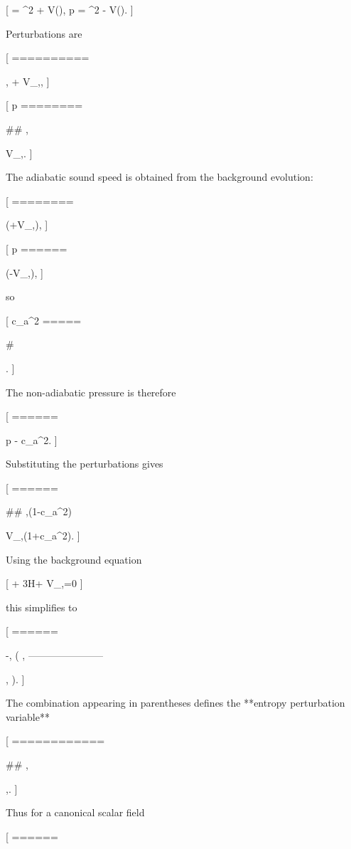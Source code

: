 [
\rho = \dot\phi^2 + V(\phi),
\qquad
p = \dot\phi^2 - V(\phi).
]

Perturbations are

[
\delta\rho
==========

\dot\phi,\delta\dot\phi
+
V_{,\phi}\delta\phi ,
]

[
\delta p
========

## \dot\phi,\delta\dot\phi

V_{,\phi}\delta\phi .
]

The adiabatic sound speed is obtained from the background evolution:

[
\dot\rho
========

\dot\phi(\ddot\phi+V_{,\phi}),
]

[
\dot p
======

\dot\phi(\ddot\phi-V_{,\phi}),
]

so

[
c_a^2
=====

# 

.
]

The non-adiabatic pressure is therefore

[
\Gamma
======

\delta p - c_a^2\delta\rho .
]

Substituting the perturbations gives

[
\Gamma
======

## \dot\phi,\delta\dot\phi(1-c_a^2)

V_{,\phi}\delta\phi(1+c_a^2).
]

Using the background equation

[
\ddot\phi + 3H\dot\phi + V_{,\phi}=0
]

this simplifies to

[
\Gamma
======

-,
\left(
\dot\phi,\delta\dot\phi
-----------------------

\ddot\phi,\delta\phi
\right).
]

The combination appearing in parentheses defines the **entropy perturbation variable**

[
\delta\sigma
============

## \dot\phi,\delta\dot\phi

\ddot\phi,\delta\phi .
]

Thus for a canonical scalar field

[
\Gamma
======

